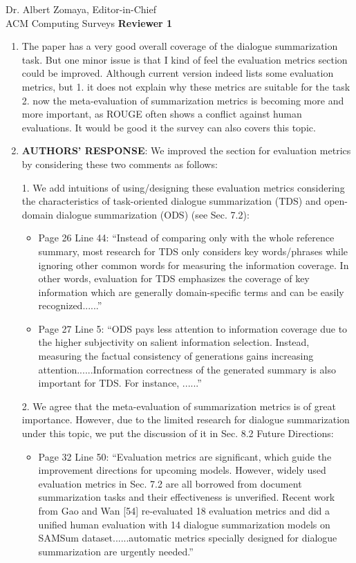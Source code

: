 \documentclass[11pt]{letter} %
\begin{document}
\begin{letter}{
Dr. Albert Zomaya, Editor-in-Chief  \\
ACM Computing Surveys}
\textbf{Reviewer 1}

\begin{enumerate}
	\item The paper has a very good overall coverage of the dialogue summarization task. But one minor issue is that I kind of feel the evaluation metrics section could be improved. Although current version indeed lists some evaluation metrics, but
	1. it does not explain why these metrics are suitable for the task
	2. now the meta-evaluation of summarization metrics is becoming more and more important, as ROUGE often shows a conflict against human evaluations. It would be good it the survey can also covers this topic.
	\item[] \textbf{AUTHORS' RESPONSE}: We improved the section for evaluation metrics by considering these two comments as follows:
	
	1. We add intuitions of using/designing these evaluation metrics considering the characteristics of task-oriented dialogue summarization (TDS) and open-domain dialogue summarization (ODS) (see Sec. 7.2):
		\begin{itemize}
			\item Page 26 Line 44: ``Instead of comparing only with the whole reference summary, most research for TDS only considers key words/phrases while ignoring other common words for measuring the information coverage. In other words, evaluation for TDS emphasizes the coverage of key information which are generally domain-specific terms and can be easily recognized......''
			\item Page 27 Line 5: ``ODS pays less attention to information coverage due to the higher subjectivity on salient information selection. Instead, measuring the factual consistency of generations gains increasing attention......Information correctness of the generated summary is also important for TDS. For instance, ......''
		\end{itemize}
	2. We agree that the meta-evaluation of summarization metrics is of great importance. However, due to the limited research for dialogue summarization under this topic, we put the discussion of it in Sec. 8.2 Future Directions:
		\begin{itemize}
			\item Page 32 Line 50: ``Evaluation metrics are significant, which guide the improvement directions for upcoming models. However, widely used evaluation metrics in Sec. 7.2 are all borrowed from document summarization tasks and their effectiveness is unverified. Recent work from Gao and Wan [54] re-evaluated 18 evaluation metrics and did a unified human evaluation with 14 dialogue summarization models on SAMSum dataset......automatic metrics specially designed for dialogue summarization are urgently needed.''
			

\end{itemize}
\end{enumerate}
\end{letter}
\end{document}
